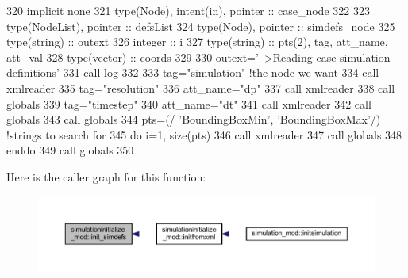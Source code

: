 \begin{DoxyCode}
320     \textcolor{keywordtype}{implicit none}
321     \textcolor{keywordtype}{type}(Node), \textcolor{keywordtype}{intent(in)}, \textcolor{keywordtype}{pointer} :: case\_node
322 
323     \textcolor{keywordtype}{type}(NodeList), \textcolor{keywordtype}{pointer} :: defsList
324     \textcolor{keywordtype}{type}(Node), \textcolor{keywordtype}{pointer} :: simdefs\_node
325     \textcolor{keywordtype}{type}(string) :: outext
326     \textcolor{keywordtype}{integer} :: i
327     \textcolor{keywordtype}{type}(string) :: pts(2), tag, att\_name, att\_val
328     \textcolor{keywordtype}{type}(vector) :: coords
329 
330     outext=\textcolor{stringliteral}{'-->Reading case simulation definitions'}
331     \textcolor{keyword}{call }log%
332 
333     tag=\textcolor{stringliteral}{"simulation"}    \textcolor{comment}{!the node we want}
334     \textcolor{keyword}{call }xmlreader%
335     tag=\textcolor{stringliteral}{"resolution"}
336     att\_name=\textcolor{stringliteral}{"dp"}
337     \textcolor{keyword}{call }xmlreader%
338     \textcolor{keyword}{call }globals%
339     tag=\textcolor{stringliteral}{"timestep"}
340     att\_name=\textcolor{stringliteral}{"dt"}
341     \textcolor{keyword}{call }xmlreader%
342     \textcolor{keyword}{call }globals%
343     \textcolor{keyword}{call }globals%
344     pts=(/ \textcolor{stringliteral}{'BoundingBoxMin'}, \textcolor{stringliteral}{'BoundingBoxMax'}/) \textcolor{comment}{!strings to search for}
345     \textcolor{keywordflow}{do} i=1, \textcolor{keyword}{size}(pts)
346         \textcolor{keyword}{call }xmlreader%
347         \textcolor{keyword}{call }globals%
348 \textcolor{keywordflow}{    enddo}
349     \textcolor{keyword}{call }globals%
350 
\end{DoxyCode}
Here is the caller graph for this function\+:\nopagebreak
\begin{figure}[H]
\begin{center}
\leavevmode
\includegraphics[width=350pt]{namespacesimulationinitialize__mod_af6b2508d52e9e29aeb6e7dfbabd88e8d_icgraph}
\end{center}
\end{figure}
\mbox{\label{namespacesimulationinitialize__mod_acaa6b217159e3a10e7db04dd7b0e4058}} 
